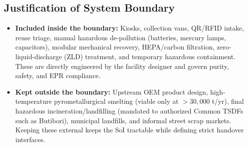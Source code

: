 

\subsection{Justification of System Boundary}
\begin{itemize}
    \item \textbf{Included inside the boundary:} Kiosks, collection vans, QR/RFID intake, reuse triage, manual hazardous de-pollution (batteries, mercury lamps, capacitors), modular mechanical recovery, HEPA/carbon filtration, zero-liquid-discharge (ZLD) treatment, and temporary hazardous containment. These are directly engineered by the facility designer and govern purity, safety, and EPR compliance.
    \item \textbf{Kept outside the boundary:} Upstream OEM product design, high-temperature pyrometallurgical smelting (viable only at $>30{,}000$ t/yr), final hazardous incineration/landfilling (mandated to authorized Common TSDFs such as Butibori), municipal landfills, and informal street scrap markets. Keeping these external keeps the SoI tractable while defining strict handover interfaces.
\end{itemize}
